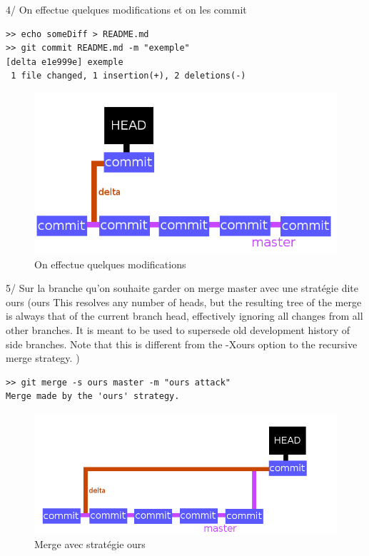 \documentclass[a4paper,10pt]{report}
\begin{document}
    4/ On effectue quelques modifications et on les commit
\begin{verbatim}
>> echo someDiff > README.md 
>> git commit README.md -m "exemple"
[delta e1e999e] exemple
 1 file changed, 1 insertion(+), 2 deletions(-)
\end{verbatim}
\begin{figure}[h!]
  \begin{center}
    \includegraphics[scale=0.3]{images/4exp}
    \caption{On effectue quelques modifications}
    \label{4exp}
  \end{center}
\end{figure}
    5/ Sur la branche qu'on souhaite garder on merge master avec une stratégie dite ours (ours
           This resolves any number of heads, but the resulting tree of the merge is always that of the current branch head, effectively ignoring
           all changes from all other branches. It is meant to be used to supersede old development history of side branches. Note that this is
           different from the -Xours option to the recursive merge strategy.
)
\begin{verbatim}
>> git merge -s ours master -m "ours attack"
Merge made by the 'ours' strategy.
\end{verbatim}
\begin{figure}[h!]
  \begin{center}
    \includegraphics[scale=0.3]{images/5exp}
    \caption{Merge avec strat\'egie ours}
    \label{5exp}
  \end{center}
\end{figure}
\end{document}
